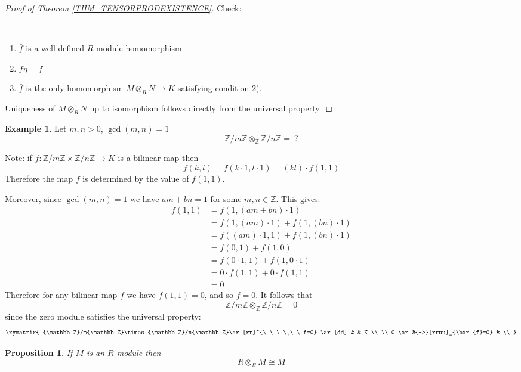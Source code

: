 \documentclass[12pt, letterpaper, oneside]{article}
\theoremstyle{plain}
\newtheorem{proposition}[theorem]{Proposition}
\theoremstyle{definition}
\newtheorem{example}[theorem]{Example}
\newcommand{\Z}{{\mathbb Z}}
\newcommand{\benu}{\begin{enumerate}}
\newcommand{\eenu}{\end{enumerate}}
\newcommand{\vs}{\vskip 5mm}
\begin{document}
\begin{proof}[Proof of Theorem \ref{THM_TENSORPRODEXISTENCE}]
Check: 

\vskip -13mm

\ 
\benu 
\item $\bar{f}$ is a well defined $R$-module homomorphism
\item $\bar{f}\eta = f$
\item $\bar{f}$ is the only homomorphism $M\otimes_{R}N \to K$ satisfying condition 2). 
\eenu

Uniqueness of $M\otimes_{R}N$ up to isomorphism follows directly from the universal property. 

\end{proof}


\vs\vs

\begin{example} 
Let $m, n>0$, $\gcd(m, n)=1$
$$\Z/m\Z \otimes_{\Z} \Z/n\Z = \ ?$$

\vs 

Note: if $f\colon \Z/m\Z \times \Z/n\Z \to K$ is a bilinear map then 
$$f(k, l) = f(k\cdot 1, l\cdot 1) = (kl)\cdot f(1, 1)$$
Therefore the map $f$ is determined by the value of $f(1, 1)$.

Moreover, since $\gcd(m, n) =1$ we have $am+bn =1$ for some $m, n\in \Z$. This gives:
\begin{align*}
f(1,1)  & =  f(1, (am+bn)\cdot 1) \\
& = f(1, (am)\cdot 1) + f(1, (bn)\cdot 1) \\
& = f((am)\cdot 1, 1) + f(1, (bn)\cdot 1) \\
& = f(0,1) + f(1, 0) \\
& = f(0\cdot 1, 1) + f(1, 0\cdot 1) \\
& = 0\cdot f(1, 1) + 0 \cdot f(1, 1) \\
& = 0
\end{align*}
Therefore for any bilinear map $f$ we have $f(1, 1)= 0$, and so $f=0$.
It follows that 
$$\Z/m\Z \otimes_{\Z} \Z/n\Z = 0$$
since the zero module satisfies the universal property:
$$
\xymatrix{
\Z/m\Z\times \Z/n\Z \ar[rr]^{\ \ \ \ \ \ f=0} \ar[dd] & & K \\
\\
0 \ar@{-->}[rruu]_{\bar{f}=0} & \\
}
$$


\end{example}


\vs\vs



\begin{proposition}
If $M$ is an $R$-module then
$$R\otimes_{R}M \cong M$$
\end{proposition}
\end{document}
